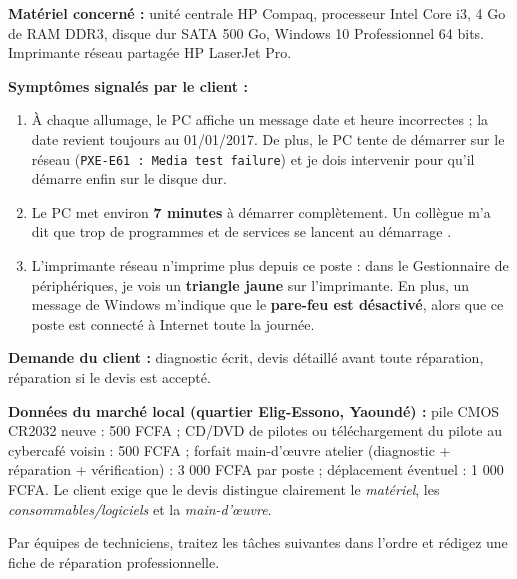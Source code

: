 \documentclass[11pt]{article}
\newcounter{popsec}
\newcounter{popsub}
\newcommand{\courssub}[1]{%
  \stepcounter{popsub}%
  \par\vspace{9pt}\noindent{\popxbold\fontsize{11.5}{13}\selectfont\color{popink}{\color{poporange}\thepopsec.\thepopsub}\hspace{6pt}#1}\par\nopagebreak\vspace{4pt}
}
\begin{document}
\begin{exemplebox}
\textbf{Matériel concerné :} unité centrale HP Compaq, processeur Intel Core i3, 4 Go de RAM DDR3, disque dur SATA 500 Go, Windows 10 Professionnel 64 bits. Imprimante réseau partagée HP LaserJet Pro.

\textbf{Symptômes signalés par le client :}
\begin{enumerate}
\item À chaque allumage, le PC affiche un message \og date et heure incorrectes \fg{} ; la date revient toujours au 01/01/2017. De plus, le PC tente de démarrer sur le réseau (\texttt{PXE-E61 : Media test failure}) et je dois intervenir pour qu'il démarre enfin sur le disque dur.
\item Le PC met environ \textbf{7 minutes} à démarrer complètement. Un collègue m'a dit que \og trop de programmes et de services se lancent au démarrage \fg.
\item L'imprimante réseau n'imprime plus depuis ce poste : dans le Gestionnaire de périphériques, je vois un \textbf{triangle jaune} sur l'imprimante. En plus, un message de Windows m'indique que le \textbf{pare-feu est désactivé}, alors que ce poste est connecté à Internet toute la journée.
\end{enumerate}
\textbf{Demande du client :} diagnostic écrit, devis détaillé avant toute réparation, réparation si le devis est accepté.
\end{exemplebox}

\textbf{Données du marché local (quartier Elig-Essono, Yaoundé) :} pile CMOS CR2032 neuve : 500 FCFA ; CD/DVD de pilotes ou téléchargement du pilote au cybercafé voisin : 500 FCFA ; forfait main-d'œuvre atelier (diagnostic + réparation + vérification) : 3 000 FCFA par poste ; déplacement éventuel : 1 000 FCFA. Le client exige que le devis distingue clairement le \emph{matériel}, les \emph{consommables/logiciels} et la \emph{main-d'œuvre}.

\courssub{Consignes}

Par équipes de techniciens, traitez les tâches suivantes dans l'ordre et rédigez une fiche de réparation professionnelle.
\end{document}
